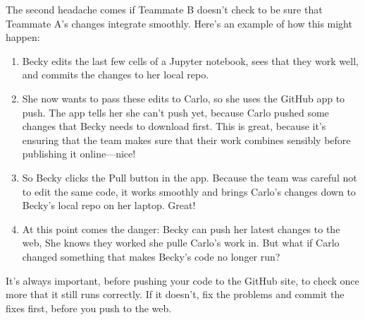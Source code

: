 \documentclass[letterpaper,10pt,english]{sphinxmanual}
\begin{document}
The second headache comes if Teammate B doesn’t check to be sure that Teammate A’s changes integrate smoothly.  Here’s an example of how this might happen:
\begin{enumerate}
%
\item {} 
Becky edits the last few cells of a Jupyter notebook, sees that they work well, and commits the changes to her local repo.

\item {} 
She now wants to pass these edits to Carlo, so she uses the GitHub app to push.  The app tells her she can’t push yet, because Carlo pushed some changes that Becky needs to download first.  This is great, because it’s ensuring that the team makes sure that their work combines sensibly before publishing it online—nice!

\item {} 
So Becky clicks the Pull button in the app.  Because the team was careful not to edit the same code, it works smoothly and brings Carlo’s changes down to Becky’s local repo on her laptop.  Great!

\item {} 
At this point comes the danger:  Becky can push her latest changes to the web,   She knows they worked  she pulle Carlo’s work in.  But what if Carlo changed something that makes Becky’s code no longer run?

\end{enumerate}

It’s always important, before pushing your code to the GitHub site, to check once more that it still runs correctly.  If it doesn’t, fix the problems and commit the fixes first, before you push to the web.
\end{document}
